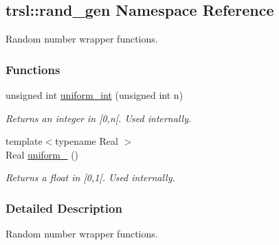 \hypertarget{namespacetrsl_1_1rand__gen}{
\subsection{trsl::rand\_\-gen Namespace Reference}
\label{namespacetrsl_1_1rand__gen}
}


Random number wrapper functions.  
\subsubsection*{Functions}
\begin{DoxyCompactItemize}
\item 
\hypertarget{namespacetrsl_1_1rand__gen_a8b8ab155014f708c35fb7594c8d13a81}{
unsigned int \hyperlink{namespacetrsl_1_1rand__gen_a8b8ab155014f708c35fb7594c8d13a81}{uniform\_\-int} (unsigned int n)}
\label{namespacetrsl_1_1rand__gen_a8b8ab155014f708c35fb7594c8d13a81}

\begin{DoxyCompactList}\small\item\em Returns an integer in {\ttfamily \mbox{[}0,n\mbox{[}}. Used internally. \item\end{DoxyCompactList}\item 
\hypertarget{namespacetrsl_1_1rand__gen_af0b1115635aac6b7eff68ca6e6846652}{
{\footnotesize template$<$typename Real $>$ }\\Real \hyperlink{namespacetrsl_1_1rand__gen_af0b1115635aac6b7eff68ca6e6846652}{uniform\_} ()}
\label{namespacetrsl_1_1rand__gen_af0b1115635aac6b7eff68ca6e6846652}

\begin{DoxyCompactList}\small\item\em Returns a float in {\ttfamily \mbox{[}0,1\mbox{[}}. Used internally. \item\end{DoxyCompactList}\end{DoxyCompactItemize}


\subsubsection{Detailed Description}
Random number wrapper functions. 